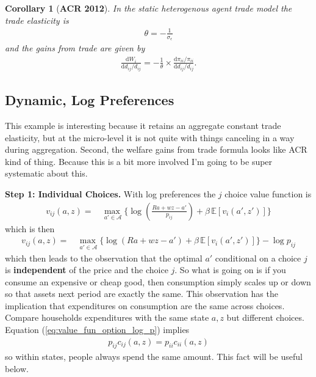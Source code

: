 \documentclass[12pt,pdftex]{article}
\newtheorem{corr}{Corollary}
\begin{document}
\begin{onehalfspacing}
\begin{corr}[\textbf{ACR 2012}] In the static heterogenous agent trade model the trade elasticity is
\begin{align}
\theta = -\frac{1}{\sigma_{\epsilon}} \nonumber
\end{align}
and the gains from trade are given by
\begin{align}
\frac{\mathrm{d} W_{i}}{\mathrm{d} d_{ij} / d_{ij}} = -\frac{1}{\theta} \times \frac{\mathrm{d} \pi_{ii} / \pi_{ii}}{\mathrm{d}d_{ij} / d_{ij}}.
\end{align}
\end{corr}

\subsection{Dynamic, Log Preferences}

This example is interesting because it retains an aggregate constant trade elasticity, but at the micro-level it is not quite with things canceling in a way during aggregation. Second, the welfare gains from trade formula looks like ACR kind of thing. Because this is a bit more involved I'm going to be super systematic about this.

\textbf{Step 1: Individual Choices.} With log preferences the $j$ choice value function is
\begin{align}
v_{ij}(a, z) = &  \max_{\ a' \in \mathcal{A} }\bigg  \{ \log\left (\frac{Ra + wz - a'}{p_{ij}} \right )  + \beta \, \mathbb{E} [v_{i}(a', z')]  \bigg\}
\end{align}
which is then
\begin{align}
v_{ij}(a, z) = &  \max_{\ a' \in \mathcal{A} }\bigg  \{ \log(Ra + wz - a' )  + \beta \, \mathbb{E} [v_{i}(a', z' )]  \bigg\} - \log p_{ij}
\label{eq:value_fun_option_log_p}
\end{align}
which then leads to the observation that the optimal $a'$ conditional on a choice $j$ is \textbf{independent} of the price and the choice $j$. So what is going on is if you consume an expensive or cheap good, then consumption simply scales up or down so that assets next period are exactly the same. This observation has the implication that expenditures on consumption are the same across choices. Compare households expenditures with the same state $a,z$ but different choices. Equation (\ref{eq:value_fun_option_log_p}) implies
\begin{align}
p_{ij}c_{ij}(a,z) = p_{ii}c_{ii}(a,z)
\label{eq:apx-same-spending}
\end{align}
so within states, people always spend the same amount. This fact will be useful below.


\end{onehalfspacing}
\end{document}
